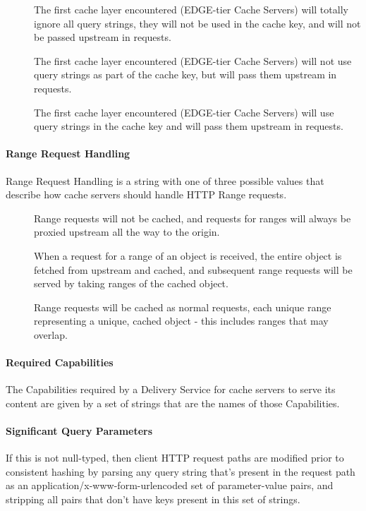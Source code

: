 \begin{description}
	\item[] The first cache layer encountered (EDGE-tier Cache
	Servers) will totally ignore all query strings, they will not be used in the
	cache key, and will not be passed upstream in requests.
	\item[] The first cache layer encountered (EDGE-tier Cache
	Servers) will not use query strings as part of the cache key, but will pass
	them upstream in requests.
	\item[] The first cache layer encountered (EDGE-tier Cache
	Servers) will use query strings in the cache key and will pass them upstream
	in requests.
\end{description}

\paragraph{Range Request Handling}
Range Request Handling is a string with one of three possible values that
describe how cache servers should handle HTTP Range requests.

\begin{description}
	\item[] Range requests will not be cached, and requests for
	ranges will always be proxied upstream all the way to the origin.
	\item[] When a request for a range of an object is
	received, the entire object is fetched from upstream and cached, and
	subsequent range requests will be served by taking ranges of the cached
	object.
	\item[] Range requests will be cached as normal requests, each
	unique range representing a unique, cached object - this includes ranges
	that may overlap.
\end{description}

\paragraph{Required Capabilities}
The Capabilities required by a Delivery Service for cache servers to serve its
content are given by a set of strings that are the names of those Capabilities.

\paragraph{Significant Query Parameters}
If this is not null-typed, then client HTTP request paths are modified prior to
consistent hashing by parsing any query string that's present in the request
path as an application/x-www-form-urlencoded set of parameter-value pairs, and
stripping all pairs that don't have keys present in this set of strings.

